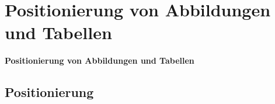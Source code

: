 \section{Positionierung von Abbildungen und Tabellen}
\begin{frame}[c]
	\begin{center}
		\LARGE \textbf{Positionierung von Abbildungen und Tabellen}
	\end{center}
\end{frame}
\subsection*{Positionierung}
